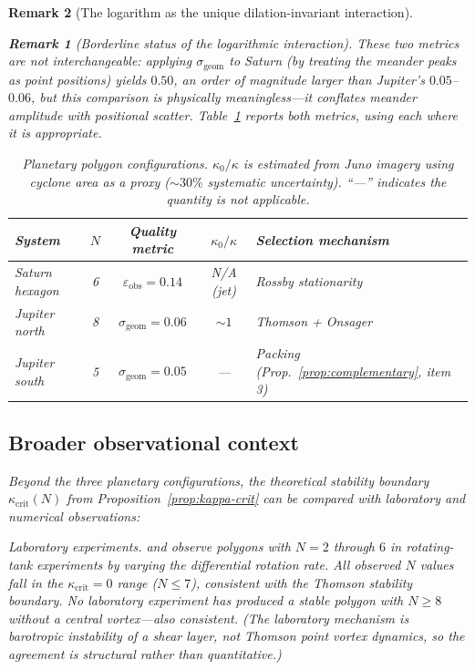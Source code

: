 \documentclass[12pt, a4paper]{article}
\newtheorem{remark}{Remark}[section]
\numberwithin{equation}{section}
\begin{document}
\begin{remark}[The logarithm as the unique dilation-invariant interaction]
\begin{remark}[Borderline status of the logarithmic interaction]
These two metrics are \emph{not interchangeable}: applying
$\sigma_{\mathrm{geom}}$ to Saturn (by treating the meander peaks as
point positions) yields $0.50$, an order of magnitude larger than
Jupiter's $0.05$--$0.06$, but this comparison is physically
meaningless---it conflates meander amplitude with positional scatter.
Table~\ref{tab:planets} reports both metrics, using each where it is
appropriate.

\begin{table}[htbp]
\centering
\caption{Planetary polygon configurations.
$\kappa_0/\kappa$ is estimated from Juno imagery \citep{Adriani2018}
using cyclone area as a proxy ($\sim\!30\%$ systematic uncertainty).
``---'' indicates the quantity is not applicable.}
\label{tab:planets}
\begin{tabular}{lcccl}
\toprule
System & $N$ & Quality metric &
  $\kappa_0/\kappa$ & Selection mechanism \\
\midrule
Saturn hexagon    & 6 & $\varepsilon_{\mathrm{obs}} = 0.14$ & N/A (jet) & Rossby stationarity \\
Jupiter north     & 8 & $\sigma_{\mathrm{geom}} = 0.06$ & $\sim\!1$ & Thomson + Onsager \\
Jupiter south     & 5 & $\sigma_{\mathrm{geom}} = 0.05$ & --- & Packing (Prop.~\ref{prop:complementary}, item 3) \\
\bottomrule
\end{tabular}
\end{table}

\subsection{Broader observational context}

Beyond the three planetary configurations, the theoretical stability
boundary $\kappa_{\mathrm{crit}}(N)$ from
Proposition~\ref{prop:kappa-crit} can be compared with laboratory and
numerical observations:

\emph{Laboratory experiments.}  \citet{Jansson2006} and
\citet{BarbosaAguiar2010} observe polygons with $N = 2$ through $6$
in rotating-tank experiments by varying the differential rotation rate.
All observed $N$ values fall in the $\kappa_{\mathrm{crit}} = 0$ range
($N \le 7$), consistent with the Thomson stability boundary.  No
laboratory experiment has produced a stable polygon with $N \ge 8$
without a central vortex---also consistent.  (The laboratory mechanism
is barotropic instability of a shear layer, not Thomson point vortex
dynamics, so the agreement is structural rather than quantitative.)


\end{remark}
\end{remark}
\end{document}
